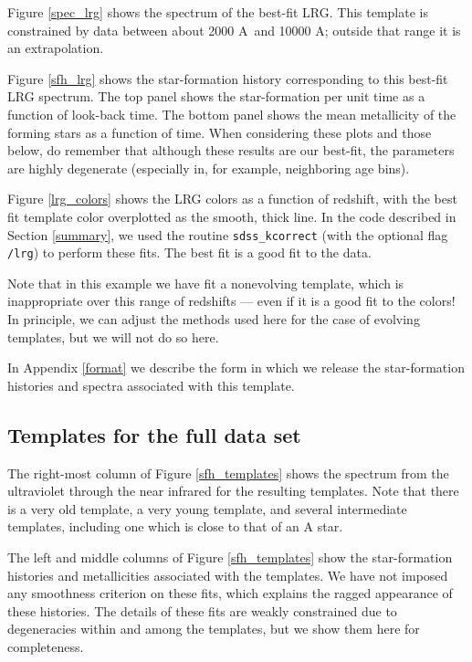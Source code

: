 \documentclass[10pt,preprint]{aastex}
\renewcommand{\AA}{A}
\begin{document}
Figure \ref{spec_lrg} shows the spectrum of the best-fit LRG.  This
template is constrained by data between about 2000 \AA\ and 10000 \AA;
outside that range it is an extrapolation.

Figure \ref{sfh_lrg} shows the star-formation history corresponding to
this best-fit LRG spectrum. The top panel shows the star-formation per
unit time as a function of look-back time.  The bottom panel shows the
mean metallicity of the forming stars as a function of time.  When
considering these plots and those below, do remember that although
these results are our best-fit, the parameters are highly degenerate
(especially in, for example, neighboring age bins). 

Figure \ref{lrg_colors} shows the LRG colors as a function of
redshift, with the best fit template color overplotted as the smooth,
thick line. In the code described in Section \ref{summary}, we used the
routine {\tt sdss\_kcorrect} (with the optional flag {\tt /lrg}) to
perform these fits. The best fit is a good fit to the data.

Note that in this example we have fit a nonevolving template, which is
inappropriate over this range of redshifts --- even if it is a good
fit to the colors! In principle, we can adjust the methods used here
for the case of evolving templates, but we will not do so here.

In Appendix \ref{format} we describe the form in which we release 
the star-formation histories and spectra associated with this
template.

\subsection{Templates for the full data set}

The right-most column of Figure \ref{sfh_templates} shows the spectrum
from the ultraviolet through the near infrared for the resulting
templates. Note that there is a very old template, a very young
template, and several intermediate templates, including one which is
close to that of an A star.

The left and middle columns of Figure \ref{sfh_templates} show the
star-formation histories and metallicities associated with the
templates. We have not imposed any smoothness criterion on these fits,
which explains the ragged appearance of these histories.  The details
of these fits are weakly constrained due to degeneracies within and
among the templates, but we show them here for completeness.
\end{document}
